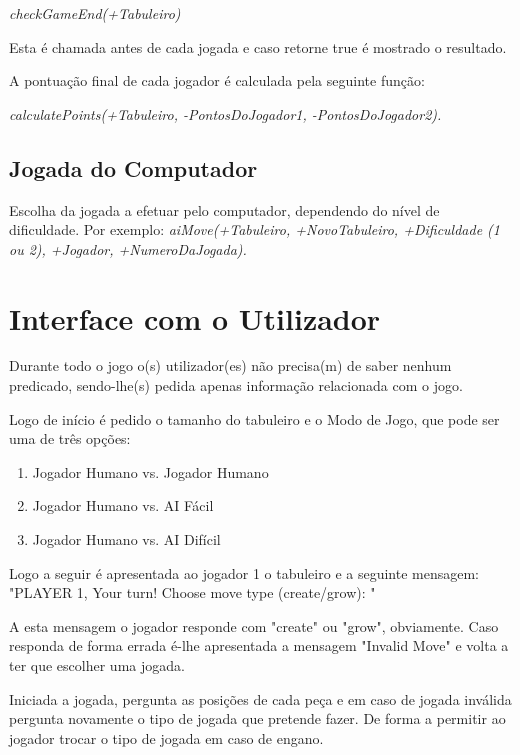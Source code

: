 \documentclass[a4paper]{article}
\begin{document}
\textit{checkGameEnd(+Tabuleiro)}

Esta é chamada antes de cada jogada e caso retorne true é mostrado o resultado.

A pontuação final de cada jogador é calculada pela seguinte função:

\textit{calculatePoints(+Tabuleiro, -PontosDoJogador1, -PontosDoJogador2).}

\subsection{Jogada do Computador} Escolha da jogada a efetuar pelo computador, dependendo do nível de dificuldade. Por exemplo: \textit{aiMove(+Tabuleiro, +NovoTabuleiro, +Dificuldade (1 ou 2), +Jogador, +NumeroDaJogada).}



\section{Interface com o Utilizador}
Durante todo o jogo o(s) utilizador(es) não precisa(m) de saber nenhum predicado, sendo-lhe(s) pedida apenas informação relacionada com o jogo.

Logo de início é pedido o tamanho do tabuleiro e o Modo de Jogo, que pode ser uma de três opções:
\begin{enumerate}
\item Jogador Humano vs. Jogador Humano
\item Jogador Humano vs. AI Fácil
\item Jogador Humano vs. AI Difícil
\end{enumerate}

Logo a seguir é apresentada ao jogador 1 o tabuleiro e a seguinte mensagem: "PLAYER 1, Your turn! Choose move type (create/grow): "

A esta mensagem o jogador responde com "create" ou "grow", obviamente. Caso responda de forma errada é-lhe apresentada a mensagem "Invalid Move" e volta a ter que escolher uma jogada.

Iniciada a jogada, pergunta as posições de cada peça e em caso de jogada inválida pergunta novamente o tipo de jogada que pretende fazer. De forma a permitir ao jogador trocar o tipo de jogada em caso de engano.
\end{document}
